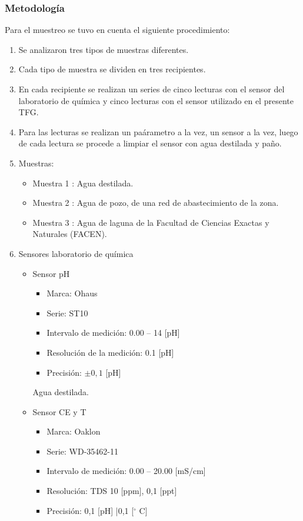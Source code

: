\subsubsection{Metodolog\'ia }
Para el muestreo se tuvo en cuenta el siguiente procedimiento:  
\begin{enumerate}
    \item Se analizaron tres tipos de muestras diferentes.
    \item Cada tipo de muestra se dividen en tres recipientes.
    \item En cada recipiente se realizan un series de cinco lecturas con el sensor del laboratorio de qu\'imica y cinco lecturas con el sensor utilizado en el presente TFG.
    \item Para las lecturas se realizan un pa\'arametro a la vez, un sensor a la vez, luego de cada lectura se procede a limpiar el sensor con agua destilada y paño.
    \item Muestras:
    \begin{itemize}
        \item Muestra 1 : Agua destilada.
        \item Muestra 2 : Agua de pozo, de una red de abastecimiento de la zona.
        \item Muestra 3 : Agua de laguna de la Facultad de Ciencias Exactas y Naturales (FACEN).
    \end{itemize}
    \item Sensores laboratorio de qu\'imica
    \begin{itemize}
        \item Sensor pH 
        \begin{itemize}
            \item Marca: Ohaus
            \item Serie: ST10
            \item Intervalo de medici\'on: 0.00 – 14 [pH]
            \item Resolución de la medici\'on: 0.1   [pH]	
            \item Precisi\'on: $\pm0,1$ [pH] 
        \end{itemize}Agua destilada.
        \item Sensor CE y T
        \begin{itemize}
            \item Marca: Oaklon
            \item Serie: WD-35462-11
            \item Intervalo de medici\'on: 0.00 – 20.00 [mS/cm]
            \item Resoluci\'on: TDS 10 [ppm], 0,1 [ppt]
            \item Precisi\'on: 0,1 [pH] |0,1 [$^{\circ}$ C]
         \end{itemize}
    \end{itemize}
\end{enumerate}

